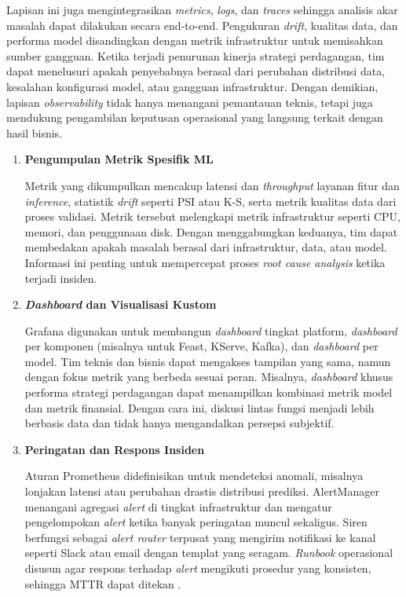 Lapisan ini juga mengintegrasikan \textit{metrics}, \textit{logs}, dan \textit{traces} sehingga analisis akar masalah dapat dilakukan secara end-to-end. Pengukuran \textit{drift}, kualitas data, dan performa model disandingkan dengan metrik infrastruktur untuk memisahkan sumber gangguan. Ketika terjadi penurunan kinerja strategi perdagangan, tim dapat menelusuri apakah penyebabnya berasal dari perubahan distribusi data, kesalahan konfigurasi model, atau gangguan infrastruktur. Dengan demikian, lapisan \textit{observability} tidak hanya menangani pemantauan teknis, tetapi juga mendukung pengambilan keputusan operasional yang langsung terkait dengan hasil bisnis.

\vspace{0.5em}
\begin{enumerate}
    \item \textbf{Pengumpulan Metrik Spesifik ML}  

    Metrik yang dikumpulkan mencakup latensi dan \textit{throughput} layanan fitur dan \textit{inference}, statistik \textit{drift} seperti PSI atau K-S, serta metrik kualitas data dari proses validasi. Metrik tersebut melengkapi metrik infrastruktur seperti CPU, memori, dan penggunaan disk. Dengan menggabungkan keduanya, tim dapat membedakan apakah masalah berasal dari infrastruktur, data, atau model. Informasi ini penting untuk mempercepat proses \textit{root cause analysis} ketika terjadi insiden.

    \vspace{0.5em}

    \item \textbf{\textit{Dashboard} dan Visualisasi Kustom}  

    Grafana digunakan untuk membangun \textit{dashboard} tingkat platform, \textit{dashboard} per komponen (misalnya untuk Feast, KServe, Kafka), dan \textit{dashboard} per model. Tim teknis dan bisnis dapat mengakses tampilan yang sama, namun dengan fokus metrik yang berbeda sesuai peran. Misalnya, \textit{dashboard} khusus performa strategi perdagangan dapat menampilkan kombinasi metrik model dan metrik finansial. Dengan cara ini, diskusi lintas fungsi menjadi lebih berbasis data dan tidak hanya mengandalkan persepsi subjektif.

    \vspace{0.5em}

    \item \textbf{Peringatan dan Respons Insiden}  

    Aturan Prometheus didefinisikan untuk mendeteksi anomali, misalnya lonjakan latensi atau perubahan drastis distribusi prediksi. AlertManager menangani agregasi \textit{alert} di tingkat infrastruktur dan mengatur pengelompokan \textit{alert} ketika banyak peringatan muncul sekaligus. Siren berfungsi sebagai \textit{alert router} terpusat yang mengirim notifikasi ke kanal seperti Slack atau email dengan templat yang seragam. \textit{Runbook} operasional disusun agar respons terhadap \textit{alert} mengikuti prosedur yang konsisten, sehingga MTTR dapat ditekan \autocite{shankar2022operationalizing}.


\end{enumerate}

